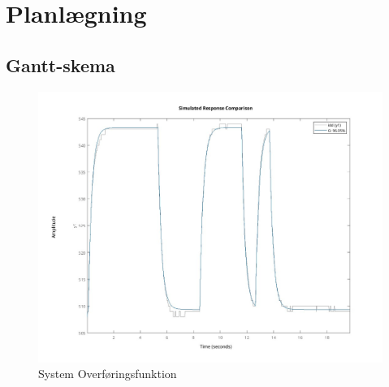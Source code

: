 \section{Planlægning}

\subsection{Gantt-skema}
\begin{figure}[H]
      \includegraphics[width=\textwidth]{Dokumentation/Figures/Motor Model Fit.jpg}
     \caption{System Overføringsfunktion}
     \label{fig: System Overføringsfunktion}
     \end{figure}
